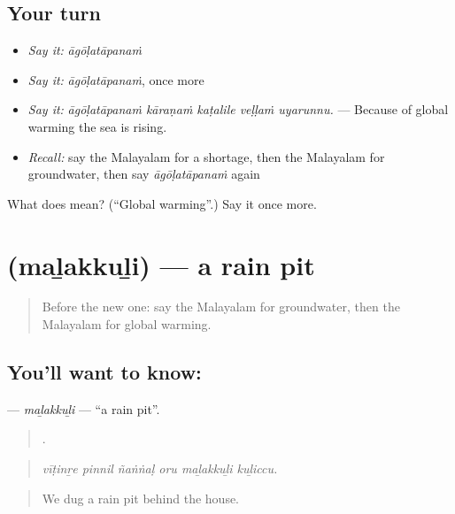 \subsection*{Your turn}
\begin{itemize}
\raggedright
  \item \emph{Say it:} \emph{āgōḷatāpanaṁ}
  \item \emph{Say it:} \emph{āgōḷatāpanaṁ}, once more
  \item \emph{Say it:} \emph{āgōḷatāpanaṁ kāraṇaṁ kaṭalile veḷḷaṁ uyarunnu.} — Because of global warming the sea is rising.
  \item \emph{Recall:} say the Malayalam for a shortage, then the Malayalam for groundwater, then say \emph{āgōḷatāpanaṁ} again
\end{itemize}

\begin{tcolorbox}[breakable,colback=teal!4,colframe=teal!35!black,title={Before you move on}]
What does  mean? (\textquotedblleft{}Global warming\textquotedblright{}.) Say it once more.
\end{tcolorbox}
\section[\texorpdfstring{\ml{മഴക്കുഴി} (maḻakkuḻi)}{മഴക്കുഴി (maḻakkuḻi)}]{ (maḻakkuḻi) — a rain pit}

\label{lesson:ML-C505-malakkuli}



\begin{quote}
Before the new one: say the Malayalam for groundwater, then the Malayalam for global warming.
\end{quote}

\subsection*{You'll want to know: }
\textbf{} — \emph{maḻakkuḻi} — \textquotedblleft{}a rain pit\textquotedblright{}.

\begin{quote}
     .
\end{quote}

\begin{quote}
\emph{vīṭinṟe pinnil ñaṅṅaḷ oru maḻakkuḻi kuḻiccu.}
\end{quote}

\begin{quote}
We dug a rain pit behind the house.
\end{quote}

